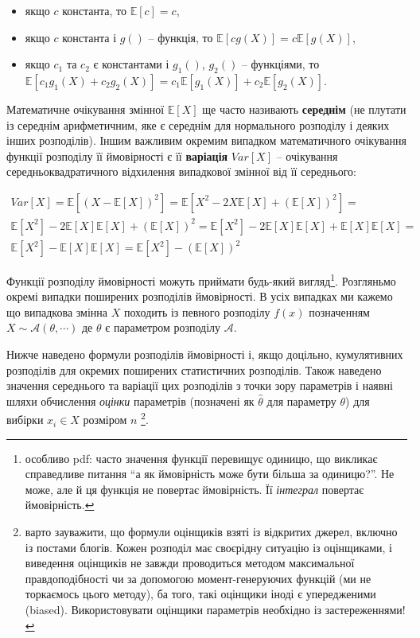 \documentclass[
  11pt,
]{book}
\begin{document}
\begin{itemize}
\item
  якщо \(c\) константа, то \(\mathbb{E}[c] = c\),
\item
  якщо \(c\) константа і \(g()\) -- функція, то \(\mathbb{E}[c g(X)] = c \mathbb{E} [g(X)]\),
\item
  якщо \(c_1\) та \(c_2\) є константами і \(g_1()\), \(g_2()\) -- функціями, то \(\mathbb{E}[c_1 g_1 (X) + c_2 g_2(X)] = c_1 \mathbb{E}[g_1(X)] + c_2 \mathbb{E}[g_2(X)]\).
\end{itemize}

Математичне очікування змінної \(\mathbb{E}[X]\) ще часто називають \textbf{середнім} (не плутати із середнім арифметичним, яке є середнім для нормального розподілу і деяких інших розподілів). Іншим важливим окремим випадком математичного очікування функції розподілу її ймовірності є її \textbf{варіація} \(Var[X]\) -- очікування середньоквадратичного відхилення випадкової змінної від її середнього:

\[
\begin{aligned}
  Var[X] = \mathbb{E} \left[ (X - \mathbb{E}[X])^2 \right] = \mathbb{E} \left[ X^2 - 2X \mathbb{E} [X] + (\mathbb{E} [X])^2 \right] = \\
  \mathbb{E} [X^2] - 2 \mathbb{E}[X] \mathbb{E}[X] + (\mathbb{E}[X])^2 = \mathbb{E} [X^2] - 2 \mathbb{E}[X] \mathbb{E}[X] + \mathbb{E}[X] \mathbb{E}[X] = \\
  \mathbb{E}[X^2] - \mathbb{E}[X] \mathbb{E}[X] = \mathbb{E}[X^2] - (\mathbb{E}[X])^2
\end{aligned}
\]

Функції розподілу ймовірності можуть приймати будь-який вигляд\footnote{особливо pdf: часто значення функції перевищує одиницю, що викликає справедливе питання ``а як ймовірність може бути більша за одиницю?''. Не може, але й ця функція не повертає ймовірність. Її \emph{інтеграл} повертає ймовірність.}. Розгляньмо окремі випадки поширених розподілів ймовірності. В усіх випадках ми кажемо що випадкова змінна \(X\) походить із певного розподілу \(f(x)\) позначенням \(X \sim \mathcal{A}(\theta, \cdots)\) де \(\theta\) є параметром розподілу \(\mathcal{A}\).

Нижче наведено формули розподілів ймовірності і, якщо доцільно, кумулятивних розподілів для окремих поширених статистичних розподілів. Також наведено значення середнього та варіації цих розподілів з точки зору параметрів і наявні шляхи обчислення \emph{оцінки} параметрів (позначені як \(\hat{\theta}\) для параметру \(\theta\)) для вибірки \(x_i \in X\) розміром \(n\) \footnote{варто зауважити, що формули оцінщиків взяті із відкритих джерел, включно із постами блогів. Кожен розподіл має своєрідну ситуацію із оцінщиками, і виведення оцінщиків не завжди проводиться методом максимальної правдоподібності чи за допомогою момент-генеруючих функцій (ми не торкаємось цього методу), ба того, такі оцінщики іноді є упередженими (biased). Використовувати оцінщики параметрів необхідно із застереженнями!}.
\end{document}
